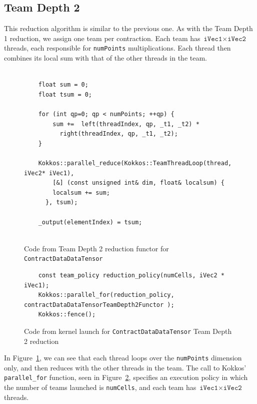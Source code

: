 \subsection{Team Depth 2}
    This reduction algorithm is similar to the previous one.  As with the Team
    Depth 1 reduction, we assign one team per contraction.  Each team has
    $\texttt{iVec1} \times \texttt{iVec2}$ threads, each responsible for
    \texttt{numPoints} multiplications.  Each thread then combines its local sum
    with that of the other threads in the team.

\begin{figure}[ht]
    \begin{lstlisting}

    float sum = 0;
    float tsum = 0;

    for (int qp=0; qp < numPoints; ++qp) {
        sum +=  left(threadIndex, qp, _t1, _t2) *
          right(threadIndex, qp, _t1, _t2);
    }

    Kokkos::parallel_reduce(Kokkos::TeamThreadLoop(thread, iVec2* iVec1),
        [&] (const unsigned int& dim, float& localsum) {
        localsum += sum;
      }, tsum);

    _output(elementIndex) = tsum;
    
 \end{lstlisting}
\caption{Code from Team Depth 2 reduction functor for \texttt{ContractDataDataTensor}
\label{lst:ContractDataDataTensorDepth2Functor}} 
\end{figure}

\begin{figure}[ht]
    \begin{lstlisting}
    const team_policy reduction_policy(numCells, iVec2 * iVec1);
    Kokkos::parallel_for(reduction_policy, contractDataDataTensorTeamDepth2Functor );
    Kokkos::fence();
 \end{lstlisting}
\caption{Code from kernel launch for \texttt{ContractDataDataTensor} Team Depth
2 reduction
\label{lst:ContractDataDataTensorDepth2Call}} 
\end{figure}

In Figure~\ref{lst:ContractDataDataTensorDepth2Functor}, we can see that each
thread loops over the \texttt{numPoints} dimension only, and then
reduces with the other threads in the team.  The call to Kokkos'
\texttt{parallel\_for} function, seen in
Figure~\ref{lst:ContractDataDataTensorDepth2Call}, specifies an execution policy
in which the number of teams launched is \texttt{numCells}, and each team has
$\texttt{iVec1}\times\texttt{iVec2}$ threads.


